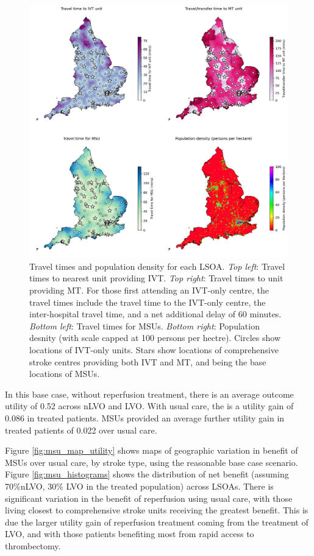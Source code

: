 \begin{figure}[h]
    \centering
    \includegraphics[width=1.0\linewidth]{images/map_times.jpg}
    \caption{Travel times and population density for each LSOA. \textit{Top left}: Travel times to nearest unit providing IVT. \textit{Top right}: Travel times to unit providing MT. For those first attending an IVT-only centre, the travel times include the travel time to the IVT-only centre, the inter-hospital travel time, and a net additional delay of 60 minutes. \textit{Bottom left}: Travel times for MSUs. \textit{Bottom right}: Population desnity (with scale capped at 100 persons per hectre). Circles show locations of IVT-only units. Stars show locations of comprehensive stroke centres providing both IVT and MT, and being the base locations of MSUs.}
    \label{fig:map_times}
\end{figure}


In this base case, without reperfusion treatment, there is an average outcome utility of 0.52 across nLVO and LVO. With usual care, the is a utility gain of 0.086 in treated patients. MSUs provided an average further utility gain in treated patients of 0.022 over usual care.

Figure \ref{fig:msu_map_utility} shows maps of geographic variation in benefit of MSUs over usual care, by stroke type, using the reasonable base case scenario. Figure \ref{fig:msu_histograms} shows the distribution of net benefit (assuming 70\%nLVO, 30\% LVO in the treated population) across LSOAs. There is significant variation in the benefit of reperfusion using usual care, with those living closest to comprehensive stroke units receiving the greatest benefit. This is due the larger utility gain of reperfusion treatment coming from the treatment of LVO, and with those patients benefiting most from rapid access to thrombectomy.

